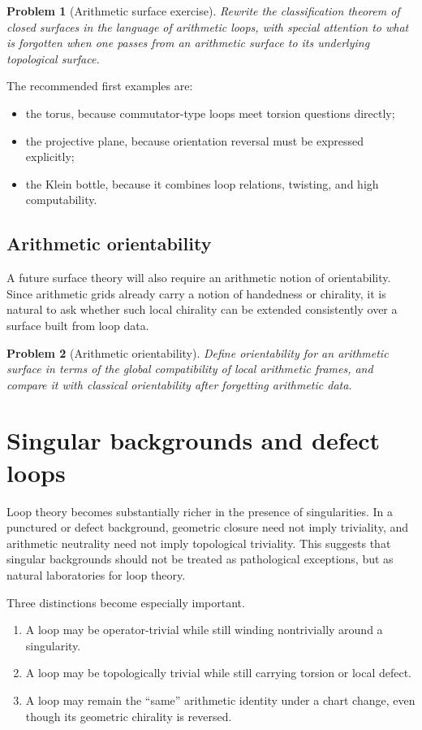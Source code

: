 \documentclass[11pt]{article}
\newtheorem{problem}{Problem}[section]
\begin{document}
\begin{problem}[Arithmetic surface exercise]
Rewrite the classification theorem of closed surfaces in the language of arithmetic loops, with special attention to what is forgotten when one passes from an arithmetic surface to its underlying topological surface.
\end{problem}

The recommended first examples are:
\begin{itemize}
\item the torus, because commutator-type loops meet torsion questions directly;
\item the projective plane, because orientation reversal must be expressed explicitly;
\item the Klein bottle, because it combines loop relations, twisting, and high computability.
\end{itemize}

\subsection{Arithmetic orientability}

A future surface theory will also require an arithmetic notion of orientability. Since arithmetic grids already carry a notion of handedness or chirality, it is natural to ask whether such local chirality can be extended consistently over a surface built from loop data.

\begin{problem}[Arithmetic orientability]
Define orientability for an arithmetic surface in terms of the global compatibility of local arithmetic frames, and compare it with classical orientability after forgetting arithmetic data.
\end{problem}

\section{Singular backgrounds and defect loops}

Loop theory becomes substantially richer in the presence of singularities. In a punctured or defect background, geometric closure need not imply triviality, and arithmetic neutrality need not imply topological triviality. This suggests that singular backgrounds should not be treated as pathological exceptions, but as natural laboratories for loop theory.

Three distinctions become especially important.
\begin{enumerate}[label=\arabic*.]
\item A loop may be operator-trivial while still winding nontrivially around a singularity.
\item A loop may be topologically trivial while still carrying torsion or local defect.
\item A loop may remain the ``same'' arithmetic identity under a chart change, even though its geometric chirality is reversed.
\end{enumerate}
\end{document}
